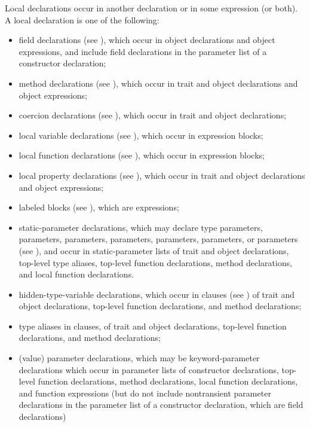 Local declarations occur in another declaration
or in some expression (or both).
A local declaration is one of the following:
\begin{itemize}

\item
field declarations (see ),
which occur in object declarations and object expressions,
and include field declarations
in the parameter list of a constructor declaration;

\item
method declarations (see ),
which occur in trait and object declarations
and object expressions;

\item
coercion declarations (see ),
which occur in trait and object declarations;

\item
local variable declarations (see ),
which occur in expression blocks;

\item
local function declarations (see ),
which occur in expression blocks;

\item
local property declarations (see ),
which occur in trait and object declarations and object expressions;

\item
labeled blocks (see ),
which are expressions;

\item
static-parameter declarations,
which may declare
type parameters,
 parameters,
 parameters,
 parameters,
 parameters,
 parameters,
or  parameters
(see ),
and occur in static-parameter lists
of trait and object declarations,
top-level type aliases,
top-level function declarations,
method declarations,
and local function declarations.

\item
hidden-type-variable declarations,
which occur in  clauses
(see )
of trait and object declarations,
top-level function declarations,
and method declarations;

\item
type aliases in  clauses,
of trait and object declarations,
top-level function declarations,
and method declarations;

\item
(value) parameter declarations,
which may be keyword-parameter declarations
which occur in parameter lists
of constructor declarations,
top-level function declarations,
method declarations,
local function declarations,
and function expressions
(but do not include nontransient parameter declarations
in the parameter list of a constructor declaration,
which are field declarations)

\end{itemize}

